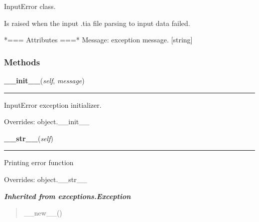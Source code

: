 InputError class.

Is raised when the input .tia file parsing to input data failed.

*=== Attributes ===* Message: exception message. [string]



  \subsubsection{Methods}

    \vspace{0.5ex}

\hspace{.8\funcindent}\begin{boxedminipage}{\funcwidth}

    \raggedright \textbf{\_\_init\_\_}(\textit{self}, \textit{message})

    \vspace{-1.5ex}

    \rule{\textwidth}{0.5\fboxrule}
\setlength{\parskip}{2ex}
    InputError exception initializer.

\setlength{\parskip}{1ex}
      Overrides: object.\_\_init\_\_

    \end{boxedminipage}

    \vspace{0.5ex}

\hspace{.8\funcindent}\begin{boxedminipage}{\funcwidth}

    \raggedright \textbf{\_\_str\_\_}(\textit{self})

    \vspace{-1.5ex}

    \rule{\textwidth}{0.5\fboxrule}
\setlength{\parskip}{2ex}
    Printing error function

\setlength{\parskip}{1ex}
      Overrides: object.\_\_str\_\_

    \end{boxedminipage}


\large{\textbf{\textit{Inherited from exceptions.Exception}}}

\begin{quote}
\_\_new\_\_()
\end{quote}

